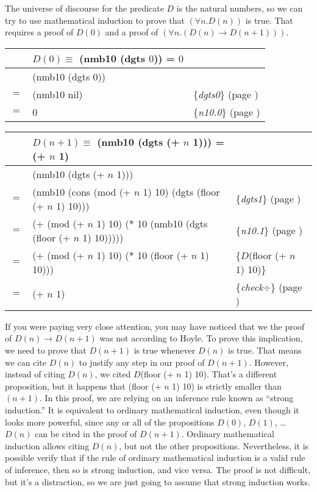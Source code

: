 The universe of discourse
for the predicate $D$ is the natural numbers,
so we can try to use mathematical induction
to prove that $(\forall n.D(n))$ is true.
That requires a proof of $D(0)$ and
a proof of $(\forall n.(D(n) \rightarrow D(n+1)))$.

\begin{center}
\begin{tabular}{lll}
    & $D(0) \equiv$ (nmb10 (dgts $0$)) = $0$ & \\
    \hline
    & (nmb10 (dgts $0$)) & \\
$=$ & (nmb10 nil)        & \{\emph{dgts0}\} (page \pageref{dgts-defun}) \\
$=$ & 0                  & \{\emph{n10.0}\} (page \pageref{nmb10-defun}) \\
\end{tabular}
\end{center}

\begin{center}
\begin{tabular}{lll}
    & $D(n+1) \equiv$ (nmb10 (dgts (+ $n$ 1))) = (+ $n$ 1) & \\
    \hline
    & (nmb10 (dgts (+ $n$ 1)))           & \\
$=$ & (nmb10 (cons (mod (+ $n$ 1) 10) (dgts (floor (+ $n$ 1) 10)))  & \{\emph{dgts1}\} (page \pageref{dgts-defun})\\
$=$ & (+ (mod (+ $n$ 1) 10) ($*$ 10 (nmb10 (dgts (floor (+ $n$ 1) 10)))))  & \{\emph{n10.1}\} (page \pageref{nmb10-defun})\\
$=$ & (+ (mod (+ $n$ 1) 10) ($*$ 10 (floor (+ $n$ 1) 10)))  & \{$D$(floor (+ $n$ 1) 10)\} \\
$=$ & (+ $n$ 1)  & \{\emph{check}$\div$\} (page \pageref{third-grade-division})
\end{tabular}
\end{center}

If you were paying very close attention,
you may have noticed that we the proof of $D(n) \rightarrow D(n+1)$
was not according to Hoyle.
To prove this implication, we need to prove that $D(n+1)$ is true whenever $D(n)$ is true.
That means we can cite $D(n)$ to justify any step in our proof of $D(n+1)$.
However, instead of citing $D(n)$, we cited $D$(floor (+ $n$ 1) 10).
That's a different proposition,
but it happens that (floor (+ $n$ 1) 10) is strictly smaller than $(n+1)$.
In this proof, we are relying on an inference rule
known as ``strong induction.''
It is equivalent to ordinary mathematical induction,
even though it looks more powerful, since any or all of the
propositions $D(0)$, $D(1)$, \dots $D(n)$ can be cited in the proof of $D(n+1)$.
Ordinary mathematical induction allows citing $D(n)$, but not the other
propositions.
Nevertheless, it is possible verify that if the rule of ordinary mathematical induction
is a valid rule of inference, then so is strong induction, and vice versa.
The proof is not difficult, but it's a distraction,
so we are just going to assume that strong induction works.

